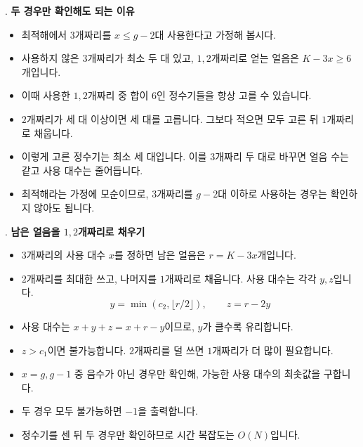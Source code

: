 \begin{frame}{\textbf{\pletter}. \ptitle}
    \textbf{두 경우만 확인해도 되는 이유}
\begin{itemize}
        \item 최적해에서 $3$개짜리를 $x\le g-2$대 사용한다고 가정해 봅시다.
        \item 사용하지 않은 $3$개짜리가 최소 두 대 있고, $1,2$개짜리로 얻는 얼음은 $K-3x\ge6$개입니다.
        \item 이때 사용한 $1,2$개짜리 중 합이 $6$인 정수기들을 항상 고를 수 있습니다.
        \item $2$개짜리가 세 대 이상이면 세 대를 고릅니다. 그보다 적으면 모두 고른 뒤 $1$개짜리로 채웁니다.
        \item 이렇게 고른 정수기는 최소 세 대입니다. 이를 $3$개짜리 두 대로 바꾸면 얼음 수는 같고 사용 대수는 줄어듭니다.
        \item 최적해라는 가정에 모순이므로, $3$개짜리를 $g-2$대 이하로 사용하는 경우는 확인하지 않아도 됩니다.
    \end{itemize}
\end{frame}

\begin{frame}{\textbf{\pletter}. \ptitle}
    \textbf{남은 얼음을 $1,2$개짜리로 채우기}
\begin{itemize}
        \item $3$개짜리의 사용 대수 $x$를 정하면 남은 얼음은 $r=K-3x$개입니다.
        \item $2$개짜리를 최대한 쓰고, 나머지를 $1$개짜리로 채웁니다. 사용 대수는 각각 $y,z$입니다.
        \[
            y=\min(c_2,\lfloor r/2\rfloor),\qquad z=r-2y
        \]
        \item 사용 대수는 $x+y+z=x+r-y$이므로, $y$가 클수록 유리합니다.
        \item $z>c_1$이면 불가능합니다. $2$개짜리를 덜 쓰면 $1$개짜리가 더 많이 필요합니다.
        \item $x=g,g-1$ 중 음수가 아닌 경우만 확인해, 가능한 사용 대수의 최솟값을 구합니다.
        \item 두 경우 모두 불가능하면 $-1$을 출력합니다.
        \item 정수기를 센 뒤 두 경우만 확인하므로 시간 복잡도는 $O(N)$입니다.
    \end{itemize}
\end{frame}
